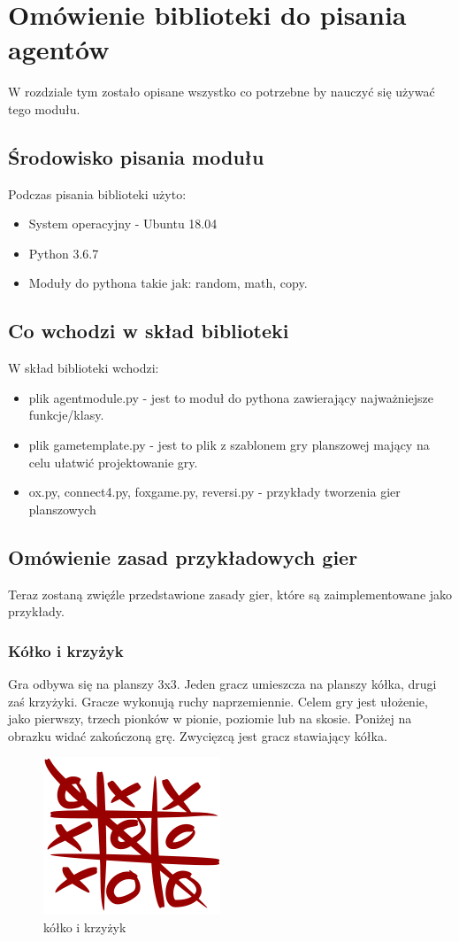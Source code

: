 \documentclass[polish,shortabstract,inz]{iithesis}
\begin{document}
\chapter{Omówienie biblioteki do pisania agentów}
W rozdziale tym zostało opisane wszystko co potrzebne by nauczyć się używać tego modułu.
\section{Środowisko pisania modułu}
Podczas pisania biblioteki użyto:
\begin{itemize}
  \item System operacyjny - Ubuntu 18.04
  \item Python 3.6.7
  \item Moduły do pythona takie jak: random, math, copy.
\end{itemize}
\section{Co wchodzi w skład biblioteki}
W skład biblioteki wchodzi:
\begin{itemize}
  \item plik agent\textunderscore module.py - jest to moduł do pythona zawierający najważniejsze funkcje/klasy.
  \item plik game\textunderscore template.py - jest to plik z szablonem gry planszowej mający na celu ułatwić projektowanie gry.
  \item ox.py, connect4.py, fox\textunderscore game.py, reversi.py - przykłady tworzenia gier planszowych
\end{itemize}


\section{Omówienie zasad przykładowych gier}
Teraz zostaną zwięźle przedstawione zasady gier, które są zaimplementowane jako przykłady.
\subsection{Kółko i krzyżyk}
Gra odbywa się na planszy 3x3. Jeden gracz umieszcza na planszy kółka, drugi zaś krzyżyki.
Gracze wykonują ruchy naprzemiennie. Celem gry jest ułożenie, jako pierwszy, trzech pionków w pionie, poziomie lub na skosie.
Poniżej na obrazku widać zakończoną grę. Zwycięzcą jest gracz stawiający kółka.
\begin{figure}[H]
  \includegraphics{./images/tictactoe.png}
  \centering
  \caption{kółko i krzyżyk}
  \label{fig:ox}
\end{figure}
\end{document}
